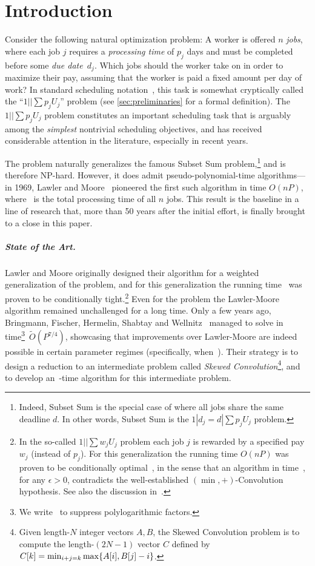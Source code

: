 \documentclass[10pt,a4paper]{article}
\DeclarePairedDelimiter\set{\lbrace}{\rbrace}
\newcommand\Order{O}
\newcommand\MTPT{\smash{$1||\sum p_j U_j$}}
\begin{document}
\section{Introduction}
\label{sec:introduction}
Consider the following natural optimization problem: A worker is offered $n$ \emph{jobs}, where each job $j$ requires a \emph{processing time} of $p_j$ days and must be completed before some \emph{due date~$d_j$}. Which jobs should the worker take on in order to maximize their pay, assuming that the worker is paid a fixed amount per day of work? In standard scheduling notation~\cite{GrahamLLK79}, this task is somewhat cryptically called the ``$1||\sum p_j U_j$'' problem (see \cref{sec:preliminaries} for a formal definition). The $1||\sum p_j U_j$ problem constitutes an important scheduling task that is arguably among the \emph{simplest} nontrivial scheduling objectives, and has received considerable attention in the literature, especially in recent years.

The \MTPT{} problem naturally generalizes the famous Subset Sum problem,\footnote{Indeed, Subset Sum is the special case of \MTPT{} where all jobs share the same deadline $d$. In other words, Subset Sum is the $1|d_j = d|\sum p_j U_j$ problem.} and is therefore NP-hard. However, it does admit pseudo-polynomial-time algorithms---in 1969, Lawler and Moore~\cite{LawlerM69} pioneered the first such algorithm in time $\Order(n P)$, where~ is the total processing time of all $n$ jobs. This result is the baseline in a line of research that, more than 50 years after the initial effort, is finally brought to a close in this paper.

\subparagraph{State of the Art.}
Lawler and Moore originally designed their algorithm for a weighted generalization of the \MTPT{} problem, and for this generalization the running time~\makebox{$\Order(nP)$} was proven to be conditionally tight.\footnote{In the so-called $1||\sum w_j U_j$ problem each job $j$ is rewarded by a specified pay~$w_j$ (instead of $p_j$). For this generalization the running time $\Order(nP)$ was proven to be conditionally optimal~\cite{CyganMWW19,KunnemannPS17}, in the sense that an algorithm in time~\smash{$\Order((n + P)^{2-\epsilon})$}, for any $\epsilon > 0$, contradicts the well-established $(\min,+)$-Convolution hypothesis. See also the discussion in~\cite{BringmannFHSW22}.} Even for the \MTPT{} problem the Lawler-Moore algorithm remained unchallenged for a long time. Only a few years ago, Bringmann, Fischer, Hermelin, Shabtay and Wellnitz~\cite{BringmannFHSW22} managed to solve \MTPT{} in time\footnote{We write~\smash{$\widetilde\Order(T) = T (\log T)^{\Order(1)}$} to suppress polylogarithmic factors.}~$\widetilde\Order(P^{7/4})$, showcasing that improvements over Lawler-Moore are indeed possible in certain parameter regimes (specifically, when~). Their strategy is to design a reduction to an intermediate problem called \emph{Skewed Convolution}\footnote{Given length-$N$ integer vectors $A, B$, the Skewed Convolution problem is to compute the length-$(2N-1)$ vector $C$ defined by $C[k] = \min_{i+j=k} \max\set{A[i], B[j] - i}$.}, and to develop an~\smash{$\widetilde\Order(N^{7/4})$}-time algorithm for this intermediate problem.
\end{document}
